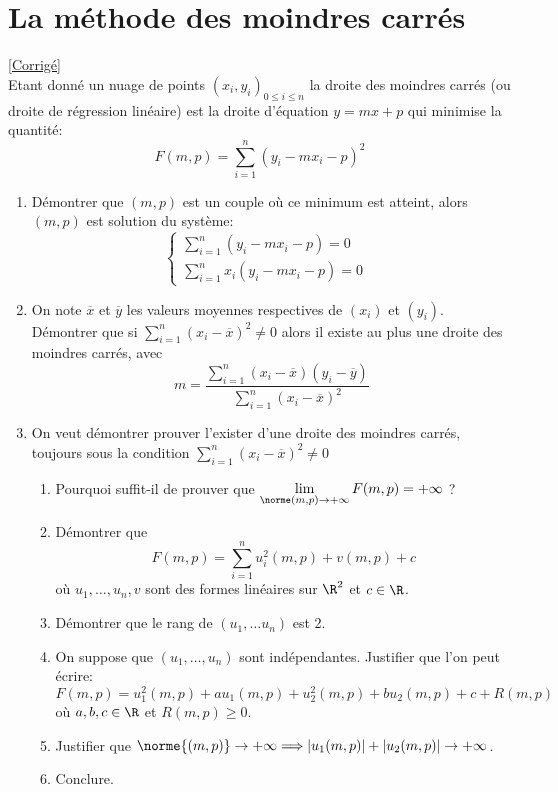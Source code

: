 \documentclass{book}
\begin{document}
\section{La méthode des moindres carrés}
\label{La méthode des moindres carrés}
\textcolor{blue}{\hyperref[sec:la-methode-des-moindres-carres]{[Corrigé]}}\\
Etant donné un nuage de points $(x_i,y_i)_{0\leq i\leq n}$ la droite des moindres carrés (ou droite de régression linéaire) est la droite d'équation $y=mx+p$ qui minimise la quantité: $$F(m,p)=\displaystyle\sum\limits_{i=1}^n(y_i-mx_i-p)^2$$
\begin{enumerate}
	\item Démontrer que $(m,p)$ est un couple où ce minimum est atteint, alors $(m,p)$ est solution du système: $$\begin{cases}
		\sum\limits_{i=1}^n(y_i-mx_i-p)=0 & \\
		\sum\limits_{i=1}^nx_i(y_i-mx_i-p)=0 &
	\end{cases}$$
	\item On note $\overline{x}$ et $\overline{y}$ les valeurs moyennes respectives de $(x_i)$ et $(y_i)$. Démontrer que si $\displaystyle\sum\limits_{i=1}^n(x_i-\overline{x})^2\ne0$ alors il existe au plus une droite des moindres carrés, avec $$m=\frac{\displaystyle\sum\limits_{i=1}^n(x_i-\overline{x})(y_i-\overline{y})}{\sum\limits_{i=1}^n(x_i-\overline{x})^2}$$
	\item On veut démontrer prouver l'exister d'une droite des moindres carrés, toujours sous la condition $\displaystyle\sum\limits_{i=1}^n(x_i-\overline{x})^2\ne0$
	\begin{enumerate}[label=\alph*.]
		\item Pourquoi suffit-il de prouver que $\lim\limits_{\norme(m,p)\to +\infty}F(m,p)=+\infty$ ?
		\item Démontrer que $$F(m,p)=\displaystyle\sum\limits_{i=1}^n u_i^2(m,p)+v(m,p)+c$$ où $u_1,\dots,u_n,v$ sont des formes linéaires sur $\R^2$ et $c\in \R$.
		\item Démontrer que le rang de $(u_1,\dots u_n)$ est 2.
		\item On suppose que $(u_1,\dots, u_n)$ sont indépendantes. Justifier que l'on peut écrire: $$F(m,p)=u_1^2(m,p)+au_1(m,p)+u_2^2(m,p)+bu_2(m,p)+c+R(m,p)$$
		où $a,b,c \in \R$ et $R(m,p)\geq 0$.
		\item Justifier que $\norme{(m,p)}\to+\infty \Longrightarrow |u_1(m,p)|+|u_2(m,p)|\to+\infty$.
		\item Conclure.
	\end{enumerate}
\end{enumerate}
\end{document}
